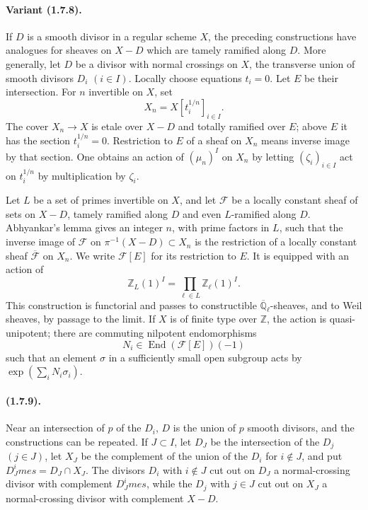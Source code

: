 \documentclass[11pt]{article}
\theoremstyle{remark}
\newcommand{\End}{\operatorname{End}}
\begin{document}
\paragraph{Variant (1.7.8).} If $D$ is a smooth divisor in a regular scheme $X$, the preceding constructions have analogues for sheaves on $X-D$ which are tamely ramified along $D$. More generally, let $D$ be a divisor with normal crossings on $X$, the transverse union of smooth divisors $D_i$ $(i\in I)$. Locally choose equations $t_i=0$. Let $E$ be their intersection. For $n$ invertible on $X$, set
\[
        X_n=X[t_i^{1/n}]_{i\in I}.
\]
The cover $X_n\to X$ is etale over $X-D$ and totally ramified over $E$; above $E$ it has the section $t_i^{1/n}=0$. Restriction to $E$ of a sheaf on $X_n$ means inverse image by that section. One obtains an action of $(\mu_n)^I$ on $X_n$ by letting $(\zeta_i)_{i\in I}$ act on $t_i^{1/n}$ by multiplication by $\zeta_i$.

Let $L$ be a set of primes invertible on $X$, and let $\mathcal F$ be a locally constant sheaf of sets on $X-D$, tamely ramified along $D$ and even $L$-ramified along $D$. Abhyankar's lemma gives an integer $n$, with prime factors in $L$, such that the inverse image of $\mathcal F$ on $\pi^{-1}(X-D)\subset X_n$ is the restriction of a locally constant sheaf $\overline{\mathcal F}$ on $X_n$. We write $\mathcal F[E]$ for its restriction to $E$. It is equipped with an action of
\[
        \mathbb Z_L(1)^I=\prod_{\ell\in L}\mathbb Z_\ell(1)^I.
\]
This construction is functorial and passes to constructible $\overline{\mathbb Q}_\ell$-sheaves, and to Weil sheaves, by passage to the limit. If $X$ is of finite type over $\mathbb Z$, the action is quasi-unipotent; there are commuting nilpotent endomorphisms
\[
        N_i\in \End(\mathcal F[E])(-1)
\]
such that an element $\sigma$ in a sufficiently small open subgroup acts by $\exp(\sum_iN_i\sigma_i)$.

\paragraph{(1.7.9).} Near an intersection of $p$ of the $D_i$, $D$ is the union of $p$ smooth divisors, and the constructions can be repeated. If $J\subset I$, let $D_J$ be the intersection of the $D_j$ $(j\in J)$, let $X_J$ be the complement of the union of the $D_i$ for $i\notin J$, and put $D_J^	imes=D_J\cap X_J$. The divisors $D_i$ with $i\notin J$ cut out on $D_J$ a normal-crossing divisor with complement $D_J^	imes$, while the $D_j$ with $j\in J$ cut out on $X_J$ a normal-crossing divisor with complement $X-D$.
\end{document}
